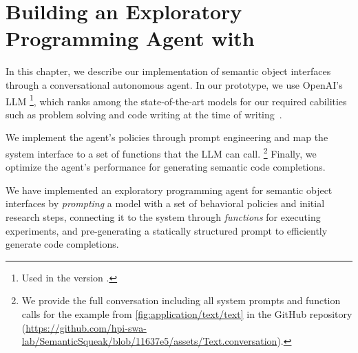 
\chapter{Building an Exploratory Programming Agent with \gptfouro}
\label{cha:agent}

In this chapter, we describe our implementation of semantic object interfaces through a conversational autonomous agent.
In our prototype, we use OpenAI's LLM \gptfouro\footnote{Used in the version .}, which ranks among the state-of-the-art models for our required cabilities such as problem solving and code writing at the time of writing~\cite{openai2024gpt4}.

We implement the agent's policies through prompt engineering and map the system interface to a set of functions that the LLM can call.%
\footnote{We provide the full conversation including all system prompts and function calls for the example from \cref{fig:application/text/text} in the GitHub repository (\url{https://github.com/hpi-swa-lab/SemanticSqueak/blob/11637e5/assets/Text.conversation}).} %
Finally, we optimize the agent's performance for generating semantic code completions.



\begin{summary}
	We have implemented an exploratory programming agent for semantic object interfaces by \emph{prompting} a \gptfouro model with a set of behavioral policies and initial research steps, connecting it to the system through \emph{functions} for executing experiments, and pre-generating a statically structured prompt to efficiently generate code completions.
\end{summary}
